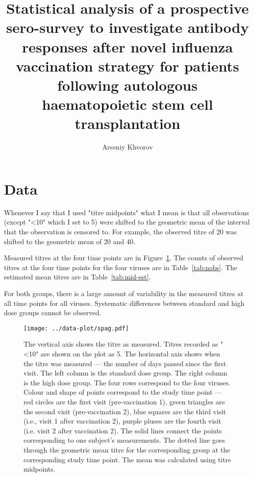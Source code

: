 \documentclass[11pt]{article}
\title{Statistical analysis of a prospective sero-survey to investigate
antibody responses
after novel influenza vaccination strategy
for patients following autologous
haematopoietic stem cell transplantation}
\author{Arseniy Khvorov}
\begin{document}
\maketitle

\section{Data}

Whenever I say that I used "titre midpoints" what I mean is that all
observations (except "<10" which I set to 5) were shifted to the geometric mean
of the interval that the observation is censored to. For example, the observed
titre of 20 was shifted to the geometric mean of 20 and 40.

Measured titres at the four time points are in Figure~\ref{fig:spag}.
The counts of observed titres at the four time points for the four viruses are
in Table~\ref{tab:nobs}.
The estimated mean titres are in Table~\ref{tab:mid-est}.

For both groups, there is a large amount of variability in the measured titres
at all time points for all viruses. Systematic differences between standard and
high dose groups cannot be observed.





\begin{figure}[htp]
    \centering
    \texttt{[image: ../data-plot/spag.pdf]}
    \caption{
        The vertical axis shows the titre as measured.
        Titres recorded as "<10" are shown on the plot as 5.
        The horizontal axis shows when the titre was measured --- the number of
        days passed since the first visit.
        The left column is the standard dose group.
        The right column is the high dose group.
        The four rows correspond to the four viruses.
        Colour and shape of points correspond to the study time point ---
        red circles are the first visit (pre-vaccination 1),
        green triangles are the second visit (pre-vaccination 2),
        blue squares are the third visit (i.e., visit 1 after vaccination 2),
        purple pluses are the fourth visit (i.e. visit 2 after vaccination 2).
        The solid lines connect the points
        corresponding to one subject's measurements.
        The dotted line goes through the geometric mean titre for the
        corresponding group at the corresponding study time point. The mean was
        calculated using titre midpoints.
    }
    \label{fig:spag}
\end{figure}
\end{document}

